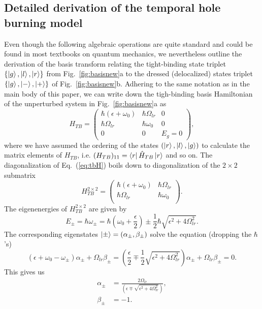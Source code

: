 \documentclass[onecolumn,secnumarabic,amssymb, nobibnotes, aip, prd]{revtex4-1}
\begin{document}
\begin{appendices}
\section{Detailed derivation of the temporal hole burning model}
\label{sec:sup-derivation}
Even though the following algebraic operations are quite standard and could be found in most textbooks on quantum mechanics, we nevertheless outline the derivation of the basis transform relating the tight-binding state triplet $\{\ket{g},\ket{l}, \ket{r}\}$ from Fig.~\ref{fig:basisnew}a to the dressed (delocalized) states triplet $\{\ket{g},\ket{-}, \ket{+}\}$ of Fig.~\ref{fig:basisnew}b. Adhering to the same notation as in the main body of this paper, we can write down the tigh-binding basis Hamiltonian of the unperturbed system in Fig.~\ref{fig:basisnew}a as 
\begin{equation}
\label{eq:tbH}
H_{TB} = \begin{pmatrix} 
\hbar (\epsilon+\omega_0) & \hbar\Omega_{lr} & 0 \\
\hbar\Omega_{lr}  & \hbar \omega_0 &  0 \\
0  & 0 & E_g = 0 
\end{pmatrix},
\end{equation}
where we have assumed the ordering of the states $(\ket{r},\ket{l},\ket{g})$ to calculate the matrix elements of $H_{TB}$, i.e. $(H_{TB})_{11} = \bra{r}\hat{H}_{TB}\ket{r}$ and so on. The diagonalization of Eq.~(\ref{eq:tbH}) boils down to diagonalization of the $2\times2$ submatrix
\begin{equation}
H_{TB}^{2\times2} = \begin{pmatrix} 
\hbar (\epsilon+\omega_0)& \hbar\Omega_{lr} \\
\hbar\Omega_{lr}  & \hbar \omega_0 \\
\end{pmatrix}.
\end{equation}
The eigenenergies of $H_{TB}^{2\times2}$ are given by 
\begin{equation}
E_{\pm} = \hbar \omega_\pm =\hbar(\omega_0+\frac{\epsilon}{2}) \pm \frac{1}{2} \hbar \sqrt{\epsilon^2+4\Omega_{lr}^2}.
\end{equation}
The corresponding eigenstates $\Ket{\pm} = (\alpha_{\pm},\beta_{\pm})$ solve the equation (dropping the $\hbar$'s)
\begin{equation}
(\epsilon+\omega_0-\omega_\pm)\alpha_\pm + \Omega_{lr}\beta_\pm = (\frac{\epsilon}{2}\mp \frac{1}{2}\sqrt{\epsilon^2+4\Omega_{lr}^2})\alpha_\pm + \Omega_{lr}\beta_\pm =0.
\end{equation}
This gives us
\begin{align}
\alpha_{\pm} &= \frac{2\Omega_{lr}}{(\epsilon\mp \sqrt{\epsilon^2+4\Omega_{lr}^2})}, \\
\beta_{\pm} &= -1.
\end{align}


\end{appendices}
\end{document}
